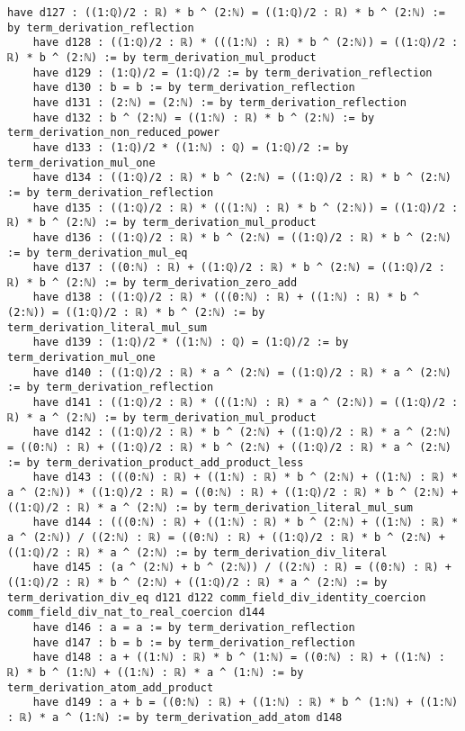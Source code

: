 \documentclass{article}
\begin{document}
\begin{tcolorbox}[colback=white!10, width=\linewidth]
\begin{lstlisting}[language=Lean4]
    have d127 : ((1:ℚ)/2 : ℝ) * b ^ (2:ℕ) = ((1:ℚ)/2 : ℝ) * b ^ (2:ℕ) := by term_derivation_reflection
    have d128 : ((1:ℚ)/2 : ℝ) * (((1:ℕ) : ℝ) * b ^ (2:ℕ)) = ((1:ℚ)/2 : ℝ) * b ^ (2:ℕ) := by term_derivation_mul_product
    have d129 : (1:ℚ)/2 = (1:ℚ)/2 := by term_derivation_reflection
    have d130 : b = b := by term_derivation_reflection
    have d131 : (2:ℕ) = (2:ℕ) := by term_derivation_reflection
    have d132 : b ^ (2:ℕ) = ((1:ℕ) : ℝ) * b ^ (2:ℕ) := by term_derivation_non_reduced_power
    have d133 : (1:ℚ)/2 * ((1:ℕ) : ℚ) = (1:ℚ)/2 := by term_derivation_mul_one
    have d134 : ((1:ℚ)/2 : ℝ) * b ^ (2:ℕ) = ((1:ℚ)/2 : ℝ) * b ^ (2:ℕ) := by term_derivation_reflection
    have d135 : ((1:ℚ)/2 : ℝ) * (((1:ℕ) : ℝ) * b ^ (2:ℕ)) = ((1:ℚ)/2 : ℝ) * b ^ (2:ℕ) := by term_derivation_mul_product
    have d136 : ((1:ℚ)/2 : ℝ) * b ^ (2:ℕ) = ((1:ℚ)/2 : ℝ) * b ^ (2:ℕ) := by term_derivation_mul_eq
    have d137 : ((0:ℕ) : ℝ) + ((1:ℚ)/2 : ℝ) * b ^ (2:ℕ) = ((1:ℚ)/2 : ℝ) * b ^ (2:ℕ) := by term_derivation_zero_add
    have d138 : ((1:ℚ)/2 : ℝ) * (((0:ℕ) : ℝ) + ((1:ℕ) : ℝ) * b ^ (2:ℕ)) = ((1:ℚ)/2 : ℝ) * b ^ (2:ℕ) := by term_derivation_literal_mul_sum
    have d139 : (1:ℚ)/2 * ((1:ℕ) : ℚ) = (1:ℚ)/2 := by term_derivation_mul_one
    have d140 : ((1:ℚ)/2 : ℝ) * a ^ (2:ℕ) = ((1:ℚ)/2 : ℝ) * a ^ (2:ℕ) := by term_derivation_reflection
    have d141 : ((1:ℚ)/2 : ℝ) * (((1:ℕ) : ℝ) * a ^ (2:ℕ)) = ((1:ℚ)/2 : ℝ) * a ^ (2:ℕ) := by term_derivation_mul_product
    have d142 : ((1:ℚ)/2 : ℝ) * b ^ (2:ℕ) + ((1:ℚ)/2 : ℝ) * a ^ (2:ℕ) = ((0:ℕ) : ℝ) + ((1:ℚ)/2 : ℝ) * b ^ (2:ℕ) + ((1:ℚ)/2 : ℝ) * a ^ (2:ℕ) := by term_derivation_product_add_product_less
    have d143 : (((0:ℕ) : ℝ) + ((1:ℕ) : ℝ) * b ^ (2:ℕ) + ((1:ℕ) : ℝ) * a ^ (2:ℕ)) * ((1:ℚ)/2 : ℝ) = ((0:ℕ) : ℝ) + ((1:ℚ)/2 : ℝ) * b ^ (2:ℕ) + ((1:ℚ)/2 : ℝ) * a ^ (2:ℕ) := by term_derivation_literal_mul_sum
    have d144 : (((0:ℕ) : ℝ) + ((1:ℕ) : ℝ) * b ^ (2:ℕ) + ((1:ℕ) : ℝ) * a ^ (2:ℕ)) / ((2:ℕ) : ℝ) = ((0:ℕ) : ℝ) + ((1:ℚ)/2 : ℝ) * b ^ (2:ℕ) + ((1:ℚ)/2 : ℝ) * a ^ (2:ℕ) := by term_derivation_div_literal
    have d145 : (a ^ (2:ℕ) + b ^ (2:ℕ)) / ((2:ℕ) : ℝ) = ((0:ℕ) : ℝ) + ((1:ℚ)/2 : ℝ) * b ^ (2:ℕ) + ((1:ℚ)/2 : ℝ) * a ^ (2:ℕ) := by term_derivation_div_eq d121 d122 comm_field_div_identity_coercion comm_field_div_nat_to_real_coercion d144
    have d146 : a = a := by term_derivation_reflection
    have d147 : b = b := by term_derivation_reflection
    have d148 : a + ((1:ℕ) : ℝ) * b ^ (1:ℕ) = ((0:ℕ) : ℝ) + ((1:ℕ) : ℝ) * b ^ (1:ℕ) + ((1:ℕ) : ℝ) * a ^ (1:ℕ) := by term_derivation_atom_add_product
    have d149 : a + b = ((0:ℕ) : ℝ) + ((1:ℕ) : ℝ) * b ^ (1:ℕ) + ((1:ℕ) : ℝ) * a ^ (1:ℕ) := by term_derivation_add_atom d148

\end{lstlisting}
\end{tcolorbox}
\end{document}
